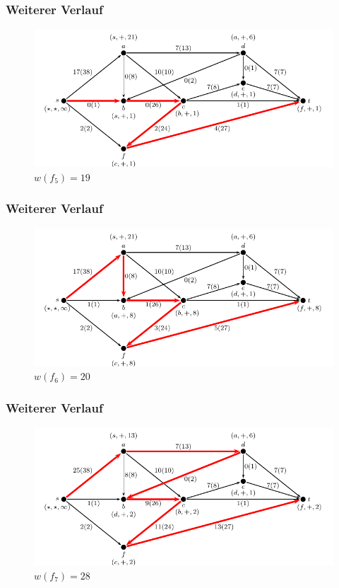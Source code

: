 \documentclass[smaller]{beamer}
\begin{document}
\begin{frame}
 \frametitle{Weiterer Verlauf}
 \begin{center}
  \begin{figure}
   \includegraphics{fig28.pdf}
   \caption{$w(f_5) = 19$}
   \label{abb:9:7}
  \end{figure}
\end{center}
\end{frame}

\begin{frame}
 \frametitle{Weiterer Verlauf}
 \begin{center}
  \begin{figure}
   \includegraphics{fig29.pdf}
   \caption{$w(f_6) = 20$}
   \label{abb:9:8}
  \end{figure}
\end{center}
\end{frame}

\begin{frame}
 \frametitle{Weiterer Verlauf}
 \begin{center}
  \begin{figure}
   \includegraphics{fig30.pdf}
   \caption{$w(f_7) = 28$}
   \label{abb:9:9}
  \end{figure}
\end{center}
\end{frame}
\end{document}
